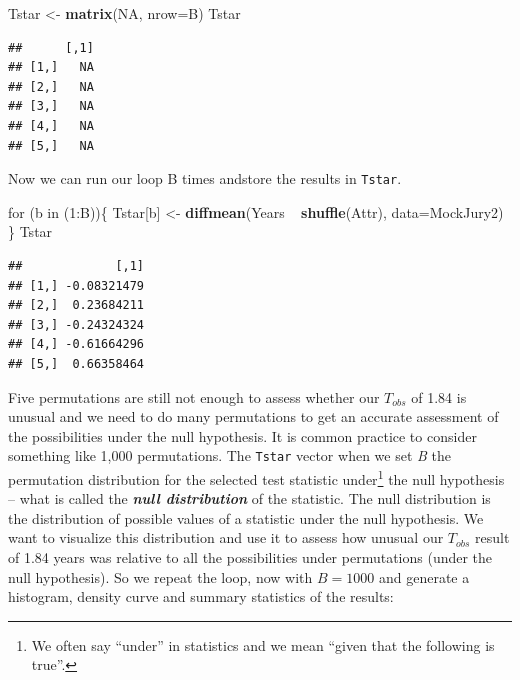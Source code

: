 \documentclass[]{book}
\newenvironment{Shaded}{\begin{snugshade}}{\end{snugshade}}
\newcommand{\KeywordTok}[1]{\textcolor[rgb]{0.13,0.29,0.53}{\textbf{{#1}}}}
\newcommand{\DataTypeTok}[1]{\textcolor[rgb]{0.13,0.29,0.53}{{#1}}}
\newcommand{\DecValTok}[1]{\textcolor[rgb]{0.00,0.00,0.81}{{#1}}}
\newcommand{\StringTok}[1]{\textcolor[rgb]{0.31,0.60,0.02}{{#1}}}
\newcommand{\OtherTok}[1]{\textcolor[rgb]{0.56,0.35,0.01}{{#1}}}
\newcommand{\NormalTok}[1]{{#1}}
\let\rmarkdownfootnote\footnote%
\def\footnote{\protect\rmarkdownfootnote}
\begin{document}
\begin{Shaded}
\begin{Highlighting}[]
\NormalTok{Tstar <-}\StringTok{ }\KeywordTok{matrix}\NormalTok{(}\OtherTok{NA}\NormalTok{, }\DataTypeTok{nrow=}\NormalTok{B)}
\NormalTok{Tstar}
\end{Highlighting}
\end{Shaded}

\begin{verbatim}
##      [,1]
## [1,]   NA
## [2,]   NA
## [3,]   NA
## [4,]   NA
## [5,]   NA
\end{verbatim}

Now we can run our loop B times andstore the results in \texttt{Tstar}.

\begin{Shaded}
\begin{Highlighting}[]
\NormalTok{for (b in (}\DecValTok{1}\NormalTok{:B))\{}
  \NormalTok{Tstar[b] <-}\StringTok{ }\KeywordTok{diffmean}\NormalTok{(Years ~}\StringTok{ }\KeywordTok{shuffle}\NormalTok{(Attr), }\DataTypeTok{data=}\NormalTok{MockJury2)}
\NormalTok{\}}
\NormalTok{Tstar}
\end{Highlighting}
\end{Shaded}

\begin{verbatim}
##             [,1]
## [1,] -0.08321479
## [2,]  0.23684211
## [3,] -0.24324324
## [4,] -0.61664296
## [5,]  0.66358464
\end{verbatim}

Five permutations are still not enough to assess whether our \(T_{obs}\)
of 1.84 is unusual and we need to do many permutations to get an
accurate assessment of the possibilities under the null hypothesis. It
is common practice to consider something like 1,000 permutations. The
\texttt{Tstar} vector when we set \emph{B} the permutation distribution
for the selected test statistic under\footnote{We often say ``under'' in
  statistics and we mean ``given that the following is true''.} the null
hypothesis -- what is called the \textbf{\emph{null distribution}} of
the statistic. The null distribution is the distribution of possible
values of a statistic under the null hypothesis. We want to visualize
this distribution and use it to assess how unusual our \(T_{obs}\)
result of 1.84 years was relative to all the possibilities under
permutations (under the null hypothesis). So we repeat the loop, now
with \(B=1000\) and generate a histogram, density curve and summary
statistics of the results:
\end{document}
